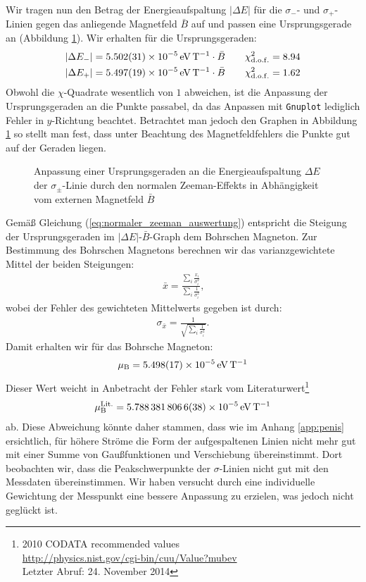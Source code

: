 \documentclass[11pt, a4paper]{article}
\begin{document}
Wir tragen nun den Betrag der Energieaufspaltung $|\Delta E|$ für die $\sigma_-$- und $\sigma_+$-Linien gegen das anliegende Magnetfeld $\bar{B}$ auf und passen eine Ursprungsgerade an (Abbildung \ref{fig:magneton_fit}).
Wir erhalten für die Ursprungsgeraden:
\begin{align}
	|\Delta E_{-}| = \SI{5.502 +- 0.031e-5}{\electronvolt\per\tesla} \cdot \bar{B} \qquad \chi_\mathrm{d.o.f.}^2 = 8.94\\
	|\Delta E_{+}| = \SI{5.497 +- 0.019e-5}{\electronvolt\per\tesla} \cdot \bar{B} \qquad \chi_\mathrm{d.o.f.}^2 = 1.62
\end{align}
Obwohl die $\chi$-Quadrate wesentlich von $1$ abweichen, ist die Anpassung der Ursprungsgeraden an die Punkte passabel, da das Anpassen mit \texttt{Gnuplot} lediglich Fehler in $y$-Richtung beachtet.
Betrachtet man jedoch den Graphen in Abbildung \ref{fig:magneton_fit} so stellt man fest, dass unter Beachtung des Magnetfeldfehlers die Punkte gut auf der Geraden liegen.
\begin{figure}[h]
	\centering
	
	\caption{Anpassung einer Ursprungsgeraden an die Energieaufspaltung $\Delta E$ der $\sigma_\pm$-Linie durch den normalen Zeeman-Effekts in Abhängigkeit vom externen Magnetfeld $\bar{B}$}
	\label{fig:magneton_fit}
\end{figure}
Gemäß Gleichung (\ref{eq:normaler_zeeman_auswertung}) entspricht die Steigung der Ursprungsgeraden im $|\Delta E|$-$\bar{B}$-Graph dem Bohrschen Magneton. Zur Bestimmung des Bohrschen Magnetons berechnen wir das varianzgewichtete Mittel der beiden Steigungen:
\begin{align}
	\bar{x} = \frac{\sum_i \frac{x_i}{\sigma_i^2}}{\sum_i \frac{1}{\sigma_i^2}}\text{,}
\end{align}
wobei der Fehler des gewichteten Mittelwerts gegeben ist durch:
\begin{align}
	\sigma_{\bar{x}} = \frac{1}{\sqrt{\sum_i \frac{1}{\sigma_i^2}}}\text{.}
\end{align}
Damit erhalten wir für das Bohrsche Magneton:
\begin{align}
	\mu_\mathrm{B} = \SI{5.498 +- 0.017e-5}{\electronvolt\per\tesla}
\end{align}
Dieser Wert weicht in Anbetracht der Fehler stark vom Literaturwert\footnote{2010 CODATA recommended values\\ \url{http://physics.nist.gov/cgi-bin/cuu/Value?mubev}\\ Letzter Abruf: 24. November 2014}
\begin{align}
	\mu_\mathrm{B}^{\mathrm{Lit.}} = \SI{5.7883818066 +- 0.0000000038e-5}{\electronvolt\per\tesla}
\end{align}
ab.
Diese Abweichung könnte daher stammen, dass wie im Anhang \ref{app:penis} ersichtlich, für höhere Ströme die Form der aufgespaltenen Linien nicht mehr gut mit einer Summe von Gaußfunktionen und Verschiebung übereinstimmt.
Dort beobachten wir, dass die Peakschwerpunkte der $\sigma$-Linien nicht gut mit den Messdaten übereinstimmen.
Wir haben versucht durch eine individuelle Gewichtung der Messpunkt eine bessere Anpassung zu erzielen, was jedoch nicht geglückt ist.
\end{document}
